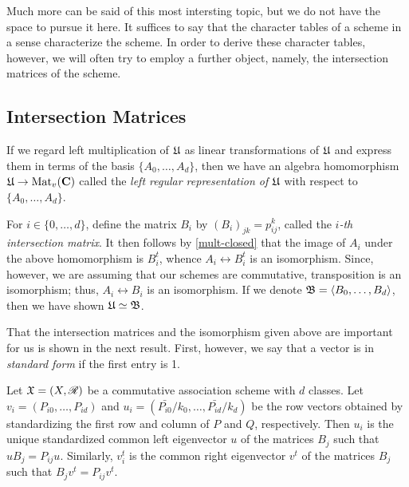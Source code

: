 \documentclass[../../../main]{subfiles}
\begin{document}
 Much more can be said of this most intersting topic, but we do not have the space to pursue it here. It suffices to say that the character tables of a scheme in a sense characterize the scheme. In order to derive these character tables, however, we will often try to employ a further object, namely, the intersection matrices of the scheme.
 
 \dinkus
 
 \subsection{Intersection Matrices}
 
 If we regard left multiplication of $\mathfrak{U}$ as linear transformations of $\mathfrak{U}$ and express them in terms of the basis $\{A_0, \dots, A_d\}$, then we have an algebra homomorphism $\mathfrak{U} \rightarrow \text{Mat}_v(\mathbf{C})$ called the {\it left regular representation of $\mathfrak{U}$} with respect to $\{A_0, \dots, A_d\}$. 
 
 For $i \in \{0, \dots, d\}$, define the matrix $B_i$ by $(B_i)_{jk}=p_{ij}^k$, called the {\it $i$-th intersection matrix}. It then follows by \ref{mult-closed} that the image of $A_i$ under the above homomorphism is $B_i^t$, whence $A_i \leftrightarrow B_i^t$ is an isomorphism. Since, however, we are assuming that our schemes are commutative, transposition is an isomorphism; thus, $A_i \leftrightarrow B_i$ is an isomorphism. If we denote $\mathfrak{B}=\langle B_0, \dots, B_d\rangle$, then we have shown $\mathfrak{U}\simeq\mathfrak{B}$.
 
 That the intersection matrices and the isomorphism given above are important for us is shown in the next result. First, however, we say that a vector is in {\it standard form} if the first entry is 1.
 
 \begin{thm}\label{intersect-thm}
 Let $\mathfrak{X}=(X,\mathscr{R})$ be a commutative association scheme with $d$ classes. Let $v_i=(P_{i0},\dots,P_{id})$ and $u_i=(\bar{P_{i0}}/k_0, \dots, \bar{P_{id}}/k_d)$ be the row vectors obtained by standardizing the first row and column of $P$ and $Q$, respectively. Then $u_i$ is the unique standardized common left eigenvector $u$ of the matrices $B_j$ such that $uB_j=P_{ij}u$. Similarly, $v_i^t$ is the common right eigenvector $v^t$ of the matrices $B_j$ such that $B_jv^t=P_{ij}v^t$.
 \end{thm}
\end{document}
